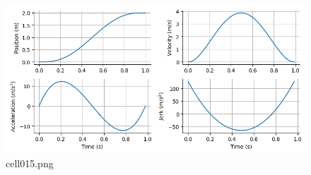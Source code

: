 \begin{figure}[ht]
	\centering
	\includegraphics[scale=0.8, max width=\linewidth]{./fig/motor-learning/minimum-jerk/cell015.png}
	\caption{cell015.png}
	\label{cell015.png}
\end{figure}